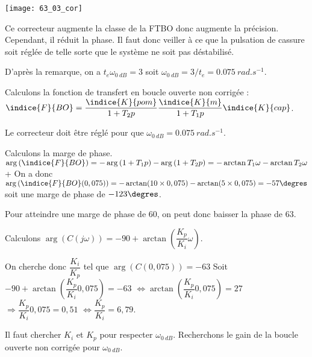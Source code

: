 \begin{marginfigure}
\texttt{[image: 63\_03\_cor]}
\end{marginfigure}


\else 
\fi


\ifprof
Ce correcteur augmente la classe de la FTBO donc augmente la précision. 
Cependant, il réduit la phase. Il faut donc veiller à ce que la pulsation de cassure soit réglée de telle sorte que le système ne soit pas déstabilisé. 
\else 
\fi


\ifprof
D'après la remarque, on a $t_e \omega_{\SI{0}{dB}}=3$ soit $\omega_{\SI{0}{dB}} =3/t_e = \SI{0,075}{rad.s^{-1}}$.
\else 
\fi


\ifprof
Calculons la fonction de transfert en boucle ouverte non corrigée : 
$\indice{F}{BO}=\dfrac{\indice{K}{pom}}{1+T_2 p}\dfrac{\indice{K}{m}}{1+T_1 p} \indice{K}{cap}$.

Le correcteur doit être réglé pour que $\omega_{\SI{0}{dB}} =\SI{0,075}{rad.s^{-1}}$. 

Calculons la marge de phase. 
$\arg\left(\indice{F}{BO}\right)=-\arg\left(1+T_1p\right)-\arg\left(1+T_2p\right) = -\arctan T_1 \omega -\arctan T_2 \omega $
+
On a donc $\arg\left(\indice{F}{BO}(0,075)\right) = -\arctan (10 \times  0,075) -\arctan (5 \times  0,075)=-57\degres$ soit une marge de phase de $-123\degres$.

Pour atteindre une marge de phase de 60\degres, on peut donc baisser la phase de 63\degres.

Calculons $\arg\left(C(j\omega)\right)=-90+\arctan \left(\dfrac{K_p}{K_i}\omega\right)$.

On cherche donc $\dfrac{K_i}{K_p}$ tel que $\arg\left(C(0,075)\right)=-63$
Soit 
$-90+\arctan \left(\dfrac{K_p}{K_i}0,075\right) =-63$
$\Leftrightarrow \arctan \left(\dfrac{K_p}{K_i}0,075\right) =27$
$\Rightarrow  \dfrac{K_p}{K_i}0,075 =0,51$
$\Leftrightarrow  \dfrac{K_p}{K_i}=6,79$.


\else 
\fi


\ifprof
Il faut chercher $K_i$ et $K_p$ pour respecter $\omega_{\SI{0}{dB}}$. Recherchons le gain de la boucle ouverte non corrigée pour $\omega_{\SI{0}{dB}}$.

